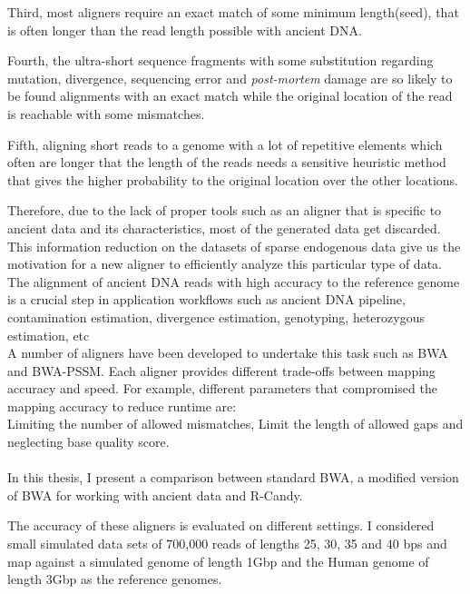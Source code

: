\documentclass[11pt,a4paper]{report}
\begin{document}
Third, most aligners require an exact match of some minimum length(seed), that is often longer than the read length possible with ancient DNA.

Fourth, the ultra-short sequence fragments with some 
substitution regarding mutation, divergence,  sequencing error and \emph{post-mortem} damage are so likely to be found alignments with an exact match while the original location of 
the read is reachable with some mismatches.

Fifth, aligning short reads to a genome with a lot of repetitive elements which often are longer that the length of the reads needs a sensitive heuristic method that gives the higher probability to the original location over the other locations.

Therefore, due to the lack of proper tools such as an aligner that is specific to ancient data and its characteristics, most of the generated data get discarded. 
This information reduction on the datasets of sparse endogenous data give us the motivation for 
a new aligner to efficiently analyze this particular type of data.
\\
The alignment of ancient DNA reads with high accuracy to the reference genome is a crucial step in application workflows such as ancient DNA pipeline, contamination estimation, divergence estimation, genotyping, heterozygous estimation, etc
\\
A number of aligners have been developed to undertake this task such as BWA\cite{bwa} and BWA-PSSM\cite{pssm}.
Each aligner provides different trade-offs between mapping accuracy and speed. 
For example, different parameters that compromised the mapping accuracy to reduce runtime are\cite{benchmarking}:\\
Limiting the number of allowed mismatches,
Limit the length of allowed gaps and
neglecting base quality score.
\\\\

In this thesis, I present a comparison between standard BWA, a modified version of BWA for working with ancient data and R-Candy.

The accuracy of these aligners is evaluated on different settings. 
I considered small simulated data sets of 700,000 reads of lengths 25, 30, 35 and 40 bps and map against a simulated genome of length 1Gbp and the Human genome of length 3Gbp as the reference genomes.
\end{document}
